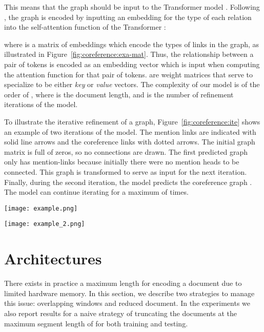 \documentclass[11pt]{article}
\begin{document}
This means that the graph should be input to the Transformer model \cite{vaswani2017attention}.  
Following \cite{mohammadshahi2020recursive}, the graph is encoded by inputting an embedding for the type of each relation into the self-attention function of the Transformer :

\vspace{-25pt}

where  is a matrix of embeddings which encode the types of links in the graph, as illustrated in Figure~\ref{fig:coreference:exa-mat}. Thus, the relationship between a pair of tokens is encoded as an embedding vector which is input when computing the attention function for that pair of tokens.  are weight matrices that serve to specialize  to be either \emph{key} or \emph{value} vectors. The complexity of our model is of the order of , where  is the document length, and  is the number of refinement iterations of the model. 

To illustrate the iterative refinement of a graph, Figure~\ref{fig:coreference:ite} shows an example of two iterations of the model. The mention links are indicated with solid line arrows and the coreference links with dotted arrows. The initial graph matrix  is full of zeros, so no connections are drawn. The first predicted graph  only has mention-links because initially there were no mention heads to be connected. This graph is transformed to serve as input  for the next iteration. Finally, during the second iteration, the model predicts the coreference graph . The model can continue iterating for a maximum of  times. 
 

\begin{figure*}
	\center
	\texttt{[image: example.png]}
	\caption{Example of iterations with G2GT.}
	\label{fig:coreference:ite}
\end{figure*}

\begin{figure*}
	\center
	\texttt{[image: example\_2.png]}
	\caption{Example of iterations with G2GT in two stages.}
	\label{fig:coreference:ite2}
\end{figure*}

 


\section{Architectures} 
\label{sec:coreference:arch}

There exists in practice a maximum length for encoding a document due to limited hardware memory. In this section, we describe two strategies to manage this issue: overlapping windows and reduced document. 
In the experiments we also report results for a naive strategy of truncating the documents at the maximum segment length of  for both training and testing.
\end{document}
